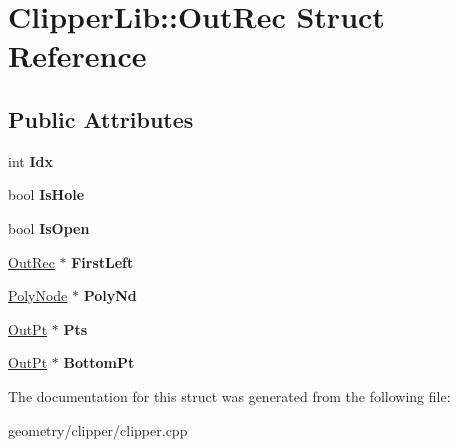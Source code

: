 \hypertarget{struct_clipper_lib_1_1_out_rec}{}\section{Clipper\+Lib\+:\+:Out\+Rec Struct Reference}
\label{struct_clipper_lib_1_1_out_rec}
\subsection*{Public Attributes}
\begin{DoxyCompactItemize}
\item 
\mbox{\label{struct_clipper_lib_1_1_out_rec_ae2c437dec114034a456a7238ab6d8055}} 
int {\bfseries Idx}
\item 
\mbox{\label{struct_clipper_lib_1_1_out_rec_a18b2b534b717139528047ba10a1c805c}} 
bool {\bfseries Is\+Hole}
\item 
\mbox{\label{struct_clipper_lib_1_1_out_rec_a065731c084453a818939c219868a2fcc}} 
bool {\bfseries Is\+Open}
\item 
\mbox{\label{struct_clipper_lib_1_1_out_rec_aa8baa934f1a7687a16b88a579dec3dd4}} 
\mbox{\hyperlink{struct_clipper_lib_1_1_out_rec}{Out\+Rec}} $\ast$ {\bfseries First\+Left}
\item 
\mbox{\label{struct_clipper_lib_1_1_out_rec_a334af720a9e0a815ba690e80e32bebd1}} 
\mbox{\hyperlink{class_clipper_lib_1_1_poly_node}{Poly\+Node}} $\ast$ {\bfseries Poly\+Nd}
\item 
\mbox{\label{struct_clipper_lib_1_1_out_rec_a82e9cba88d46d0d60db0b0365c6bd02e}} 
\mbox{\hyperlink{struct_clipper_lib_1_1_out_pt}{Out\+Pt}} $\ast$ {\bfseries Pts}
\item 
\mbox{\label{struct_clipper_lib_1_1_out_rec_adc4d612df109de83dca298204176ff0c}} 
\mbox{\hyperlink{struct_clipper_lib_1_1_out_pt}{Out\+Pt}} $\ast$ {\bfseries Bottom\+Pt}
\end{DoxyCompactItemize}


The documentation for this struct was generated from the following file\+:\begin{DoxyCompactItemize}
\item 
geometry/clipper/clipper.\+cpp\end{DoxyCompactItemize}
